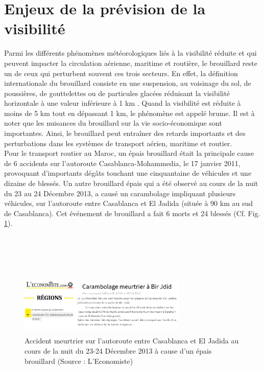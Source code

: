 \section{Enjeux de la prévision de la visibilité}
Parmi les différents phénomènes météorologiques liés à la visibilité réduite et qui peuvent impacter la circulation aérienne, maritime et routière, le brouillard reste un de ceux qui perturbent souvent ces trois secteurs. En effet, la définition internationale du brouillard consiste en une suspension, au voisinage du sol, de poussières, de gouttelettes ou de particules glacées réduisant la visibilité horizontale à une valeur inférieure à 1 km \citep{def_broui}. Quand la visibilité est réduite à moins de 5 km tout en dépassant 1 km, le phénomène est appelé brume. Il est à noter que les nuisances du brouillard sur la vie socio-économique sont importantes. Ainsi, le brouillard peut entraîner des retards importants et des perturbations dans les systèmes de transport aérien, maritime et routier.\\

Pour le transport routier au Maroc, un épais brouillard était la principale cause de 6 accidents sur l’autoroute Casablanca-Mohammedia, le 17 janvier 2011, provoquant d’importants dégâts touchant une cinquantaine de véhicules et une dizaine de blessés. Un autre brouillard épais qui a été observé au cours de la nuit du 23 au 24 Décembre 2013, a causé un carambolage impliquant plusieurs véhicules, sur l’autoroute entre Casablanca et El Jadida (située à 90 km au sud de Casablanca). Cet événement de brouillard a fait 6 morts et 24 blessés (Cf. Fig. \ref{eco}).\\ \\ \\ \\ \\
\begin{figure}[!h]
\parbox{9cm}{ \includegraphics[width=8cm, height=3cm]{img/econ.png}
}
\parbox{5cm}{\caption{ Accident meurtrier sur l’autoroute entre Casablanca et El Jadida au cours de la nuit du 23-24 Décembre 2013 à cause d’un épais brouillard (Source : L’Economiste)}
\label{eco}
}
\end{figure}



